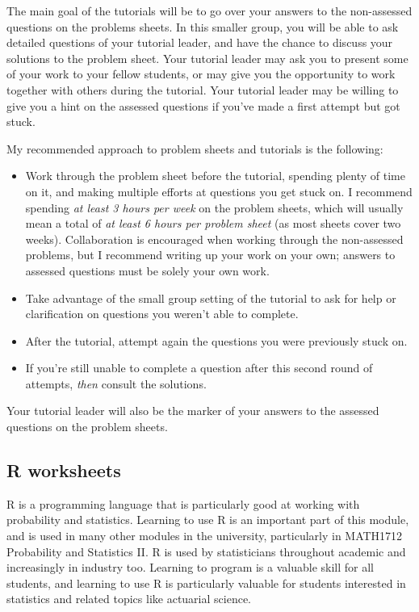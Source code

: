 \documentclass[
  a4paper,
]{book}
\providecommand{\tightlist}{%
  \setlength{\itemsep}{0pt}\setlength{\parskip}{0pt}}
\theoremstyle{definition}
\theoremstyle{definition}
\theoremstyle{definition}
\theoremstyle{remark}
\begin{document}
The main goal of the tutorials will be to go over your answers to the non-assessed questions on the problems sheets. In this smaller group, you will be able to ask detailed questions of your tutorial leader, and have the chance to discuss your solutions to the problem sheet. Your tutorial leader may ask you to present some of your work to your fellow students, or may give you the opportunity to work together with others during the tutorial. Your tutorial leader may be willing to give you a hint on the assessed questions if you've made a first attempt but got stuck.

My recommended approach to problem sheets and tutorials is the following:

\begin{itemize}
\tightlist
\item
  Work through the problem sheet before the tutorial, spending plenty of time on it, and making multiple efforts at questions you get stuck on. I recommend spending \emph{at least 3 hours per week} on the problem sheets, which will usually mean a total of \emph{at least 6 hours per problem sheet} (as most sheets cover two weeks). Collaboration is encouraged when working through the non-assessed problems, but I recommend writing up your work on your own; answers to assessed questions must be solely your own work.
\item
  Take advantage of the small group setting of the tutorial to ask for help or clarification on questions you weren't able to complete.
\item
  After the tutorial, attempt again the questions you were previously stuck on.
\item
  If you're still unable to complete a question after this second round of attempts, \emph{then} consult the solutions.
\end{itemize}

Your tutorial leader will also be the marker of your answers to the assessed questions on the problem sheets.

\hypertarget{r-worksheets}{%
\subsection*{R worksheets}\label{r-worksheets}}

R is a programming language that is particularly good at working with probability and statistics. Learning to use R is an important part of this module, and is used in many other modules in the university, particularly in MATH1712 Probability and Statistics II. R is used by statisticians throughout academic and increasingly in industry too. Learning to program is a valuable skill for all students, and learning to use R is particularly valuable for students interested in statistics and related topics like actuarial science.
\end{document}
